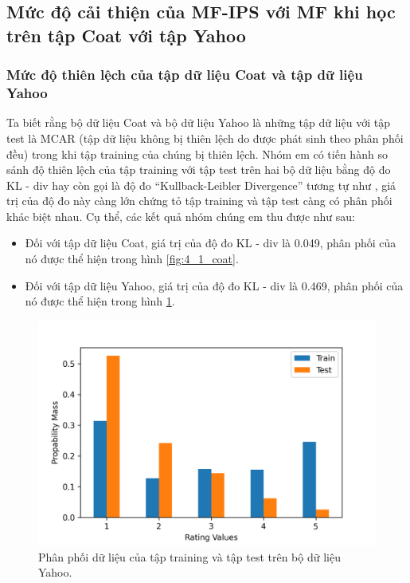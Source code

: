 \subsection{Mức độ cải thiện của MF-IPS với MF khi học trên tập Coat với tập Yahoo}
\subsubsection{Mức độ thiên lệch của tập dữ liệu Coat và tập dữ liệu Yahoo}
Ta biết rằng bộ dữ liệu Coat và bộ dữ liệu Yahoo là những tập dữ liệu với tập test là MCAR (tập dữ liệu không bị thiên lệch do được phát sinh theo phân phối đều) trong khi tập training của chúng bị thiên lệch. Nhóm em có tiến hành so sánh độ thiên lệch của tập training với tập test trên hai bộ dữ liệu bằng độ đo KL - div hay còn gọi là độ đo ``Kullback-Leibler Divergence'' tương tự như \cite{saito2020asymmetric}, giá trị của độ đo này càng lớn chứng tỏ tập training và tập test càng có phân phối khác biệt nhau. Cụ thể, các kết quả nhóm chúng em thu được như sau: 
\begin{itemize}
    \item Đối với tập dữ liệu Coat, giá trị của độ đo KL - div là 0.049, phân phối của nó được thể hiện trong hình \ref{fig:4_1_coat}.
    \item Đối với tập dữ liệu Yahoo, giá trị của độ đo KL - div là 0.469, phân phối của nó được thể hiện trong hình \ref{fig:4_2_yahoo}.
\end{itemize}

\begin{figure}[h]
    \centering
    \includegraphics[width=\textwidth]{images/Chapter4/Diff_yahoo.png}
    \caption{Phân phối dữ liệu của tập training và tập test trên bộ dữ liệu Yahoo.}
    \label{fig:4_2_yahoo}
\end{figure}

